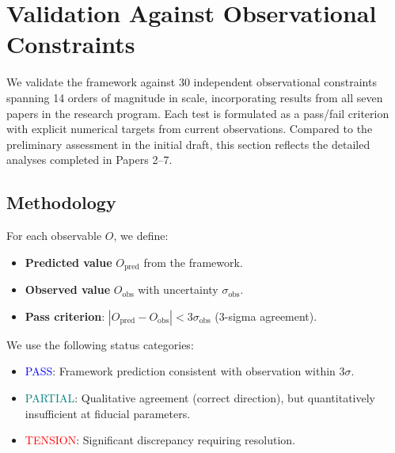 \documentclass[11pt,a4paper]{article}
\theoremstyle{definition}
\theoremstyle{remark}
\begin{document}
\section{Validation Against Observational Constraints}
\label{sec:validation}

We validate the framework against 30 independent observational constraints spanning 14 orders of magnitude in scale, incorporating results from all seven papers in the research program. Each test is formulated as a pass/fail criterion with explicit numerical targets from current observations. Compared to the preliminary assessment in the initial draft, this section reflects the detailed analyses completed in Papers 2--7.

\subsection{Methodology}
\label{sec:validation_method}

For each observable $O$, we define:
\begin{itemize}[leftmargin=*, itemsep=0.2em]
\item \textbf{Predicted value} $O_{\mathrm{pred}}$ from the framework.
\item \textbf{Observed value} $O_{\mathrm{obs}}$ with uncertainty $\sigma_{\mathrm{obs}}$.
\item \textbf{Pass criterion}: $|O_{\mathrm{pred}} - O_{\mathrm{obs}}| < 3\sigma_{\mathrm{obs}}$ (3-sigma agreement).
\end{itemize}

We use the following status categories:
\begin{itemize}[leftmargin=*, itemsep=0.2em]
\item \textcolor{blue}{PASS}: Framework prediction consistent with observation within $3\sigma$.
\item \textcolor{teal}{PARTIAL}: Qualitative agreement (correct direction), but quantitatively insufficient at fiducial parameters.
\item \textcolor{red}{TENSION}: Significant discrepancy requiring resolution.
\end{itemize}
\end{document}
